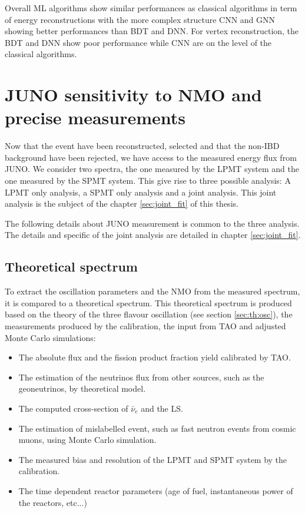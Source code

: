 \documentclass[../main.tex]{subfiles}
\begin{document}
Overall ML algorithms show similar performances as classical algorithms in term of energy reconstructions with the more complex structure CNN and GNN showing better performances than BDT and DNN. For vertex reconstruction, the BDT and DNN show poor performance while CNN are on the level of the classical algorithms.

\section{JUNO sensitivity to NMO and precise measurements}
\label{sec:juno:Fit}

Now that the event have been reconstructed, selected and that the non-IBD background have been rejected, we have access to the measured energy flux from JUNO. We consider two spectra, the one measured by the LPMT system and the one measured by the SPMT system. This give rise to three possible analysis: A LPMT only analysis, a SPMT only analysis and a joint analysis. This joint analysis is the subject of the chapter \ref{sec:joint_fit} of this thesis.

The following details about JUNO measurement is common to the three analysis. The details and specific of the joint analysis are detailed in chapter \ref{sec:joint_fit}.

\subsection{Theoretical spectrum}

To extract the oscillation parameters and the NMO from the measured spectrum, it is compared to a theoretical spectrum. This theoretical spectrum is produced based on the theory of the three flavour oscillation (see section \ref{sec:th:osc}), the measurements produced by the calibration, the input from TAO and adjusted Monte Carlo simulations:
\begin{itemize}
  \item The absolute flux and the fission product fraction yield calibrated by TAO.
  \item The estimation of the neutrinos flux from other sources, such as the geoneutrinos, by theoretical model.
  \item The computed cross-section of $\bar{\nu}_e$ and the LS.
  \item The estimation of mislabelled event, such as fast neutron events from cosmic muons, using Monte Carlo simulation.
  \item The measured bias and resolution of the LPMT and SPMT system by the calibration.
  \item The time dependent reactor parameters (age of fuel, instantaneous power of the reactors, etc...)
\end{itemize}
\end{document}
